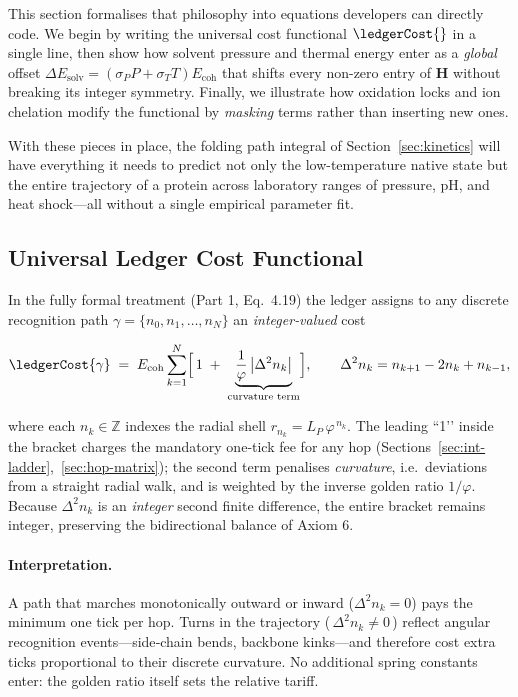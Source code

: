 \documentclass[11pt]{article}
\newcommand{\phiGR}{\varphi}                 %
\newcommand{\LP}{L_{\!P}}                    %
\newcommand{\Eoh}{E_{\mathrm{coh}}}          %
\begin{document}
This section formalises that philosophy into equations developers can
directly code.  We begin by writing the universal cost functional
$\ledgerCost{}$ in a single line, then show how solvent pressure and
thermal energy enter as a \emph{global} offset
$\Delta E_{\text{solv}}=(\sigma_{P}P+\sigma_{T}T)\Eoh$ that shifts every
non-zero entry of $\mathbf H$ without breaking its integer symmetry.
Finally, we illustrate how oxidation locks and ion chelation modify the
functional by \emph{masking} terms rather than inserting new ones.

With these pieces in place, the folding path integral of
Section~\ref{sec:kinetics} will have everything it needs to predict not
only the low-temperature native state but the entire trajectory of a
protein across laboratory ranges of pressure, pH, and heat shock—all
without a single empirical parameter fit.

\subsection{Universal Ledger Cost Functional}\label{sec:cost-functional}

In the fully formal treatment (Part 1, Eq.\ 4.19) the ledger assigns to
any discrete recognition path $\gamma=\{n_{0},n_{1},\dots,n_{N}\}$ an
\emph{integer‐valued} cost

\[
\ledgerCost{\gamma}
\;=\;
\Eoh
\sum_{k=1}^{N}
\Bigl[\,1
      \;+\;
      \underbrace{\frac{1}{\phiGR}\,
      \bigl|\Delta^{2}n_{k}\bigr|}_{\text{curvature term}}
\Bigr],
\qquad
\Delta^{2}n_{k}=n_{k+1}-2n_{k}+n_{k-1},
\]

where each $n_{k}\in\mathbb Z$ indexes the radial shell
$r_{n_{k}}=\LP\,\phiGR^{\,n_{k}}$.  The leading “1’’ inside the bracket
charges the mandatory one‐tick fee for any hop
(Sections~\ref{sec:int-ladder},~\ref{sec:hop-matrix}); the second term
penalises \emph{curvature}, i.e.\ deviations from a straight radial
walk, and is weighted by the inverse golden ratio $1/\phiGR$.  Because
$\Delta^{2}n_{k}$ is an \emph{integer} second finite difference, the
entire bracket remains integer, preserving the bidirectional
balance of Axiom 6.

\paragraph{Interpretation.}
A path that marches monotonically outward or inward
($\Delta^{2}n_{k}=0$) pays the minimum one tick per hop.  Turns in the
trajectory (\,$\Delta^{2}n_{k}\neq 0$\,) reflect angular recognition
events—side‐chain bends, backbone kinks—and therefore cost extra ticks
proportional to their discrete curvature.  No additional spring constants
enter: the golden ratio itself sets the relative tariff.
\end{document}
